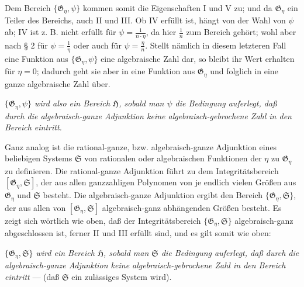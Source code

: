 Dem Bereich $\{\mathfrak G_\eta,\psi\}$ kommen somit die Eigenschaften I und V
zu; und da $\mathfrak G_\eta$ ein Teiler des Bereichs, auch II und III. Ob IV
erfüllt ist, hängt von der Wahl von $\psi$ ab; IV ist z. B. nicht erfüllt für
$\psi=\frac{1}{n\cdot\eta}$, da hier $\frac1n$ zum Bereich gehört; wohl aber
nach § 2 für $\psi=\frac1\eta$ oder auch für $\psi=\frac{\eta}{n}$. Stellt
nämlich in diesem letzteren Fall eine Funktion aus $\{\mathfrak G_\eta,\psi\}$
eine algebraische Zahl dar, so bleibt ihr Wert erhalten für $\eta=0$; dadurch
geht sie aber in eine Funktion aus $\mathfrak G_\eta$ und folglich in eine ganze
algebraische Zahl über.

\emph{$\{\mathfrak G_\eta,\psi\}$ wird also ein Bereich $\mathfrak H$, sobald
man $\psi$ die Bedingung auferlegt, daß durch die algebraisch-ganze Adjunktion
keine algebraisch-gebrochene Zahl in den Bereich eintritt.}

Ganz analog ist die rational-ganze, bzw. algebraisch-ganze Adjunktion eines
beliebigen Systems $\mathfrak S$ von rationalen oder algebraischen Funktionen der
$\eta$ zu $\mathfrak G_\eta$ zu definieren. Die rational-ganze Adjunktion führt
zu dem Integritätsbereich $[\mathfrak G_\eta,\mathfrak S]$, der aus allen
ganzzahligen Polynomen von je endlich vielen Größen aus $\mathfrak G_\eta$ und
$\mathfrak S$ besteht. Die algebraisch-ganze Adjunktion ergibt den Bereich
$\{\mathfrak G_\eta,\mathfrak S\}$, der aus allen von
$[\mathfrak G_\eta,\mathfrak S]$ algebraisch-ganz abhängenden Größen besteht.
Es zeigt sich wörtlich wie oben, daß der Integritätsbereich
$\{\mathfrak G_\eta,\mathfrak S\}$ algebraisch-ganz abgeschlossen ist, ferner II
und III erfüllt sind, und es gilt somit wie oben:

\emph{$\{\mathfrak G_\eta,\mathfrak S\}$ wird ein Bereich $\mathfrak H$, sobald
man $\mathfrak S$ die Bedingung auferlegt, daß durch die algebraisch-ganze
Adjunktion keine algebraisch-gebrochene Zahl in den Bereich eintritt} --- (daß
$\mathfrak S$ ein zulässiges System wird).

